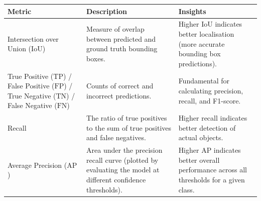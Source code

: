 \begin{table}[!htbp]
	\centering
	\small
	\begin{tabularx}{\textwidth}{@{\extracolsep{\fill}}>{\raggedright\arraybackslash}X >{\raggedright\arraybackslash}X >{\raggedright\arraybackslash}X}
		\toprule
		\textbf{Metric}                                                                                                                 & \textbf{Description}                                                                                          & \textbf{Insights}                                                                                                                                                                      \\
		\midrule
		Intersection over Union ($\mathrm{IoU}$)                                                                                        & Measure of overlap between predicted and ground truth bounding boxes.                                         & Higher IoU indicates better localisation (more accurate bounding box predictions).                                                                                                     \\
		\addlinespace
		True Positive ($\mathrm{TP}$) / False Positive ($\mathrm{FP}$) / True Negative ($\mathrm{TN}$) / False Negative ($\mathrm{FN}$) & Counts of correct and incorrect predictions.                                                                  & Fundamental for calculating precision, recall, and F1-score.                                                                                                                           \\
		\addlinespace
		Recall                                                                                                                          & The ratio of true positives to the sum of true positives and false negatives.                                 & Higher recall indicates better detection of actual objects.                                                                                                                            \\
		\addlinespace
		Average Precision ($\mathrm{AP}$)                                                                                               & Area under the precision recall curve (plotted by evaluating the model at different confidence thresholds).   & Higher AP indicates better overall performance across all thresholds for a given class.                                                                                                \\

\end{tabularx}
\end{table}
